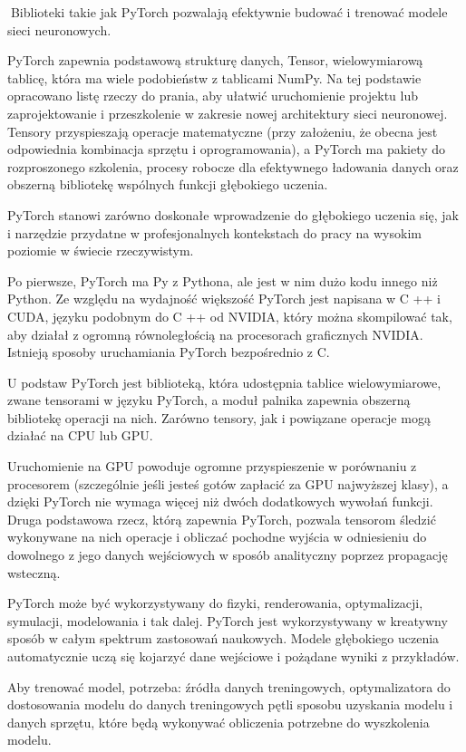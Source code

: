 \documentclass[brudnopis]{xmgr}
\begin{document}
􏰹Biblioteki takie jak PyTorch pozwalają efektywnie budować i trenować modele sieci neuronowych.

PyTorch zapewnia podstawową strukturę danych, Tensor, wielowymiarową tablicę, która ma wiele podobieństw z tablicami NumPy. Na tej podstawie opracowano listę rzeczy do prania, aby ułatwić uruchomienie projektu lub zaprojektowanie i przeszkolenie w zakresie nowej architektury sieci neuronowej. Tensory przyspieszają operacje matematyczne (przy założeniu, że obecna jest odpowiednia kombinacja sprzętu i oprogramowania), a PyTorch ma pakiety do rozproszonego szkolenia, procesy robocze dla efektywnego ładowania danych oraz obszerną bibliotekę wspólnych funkcji głębokiego uczenia.

PyTorch stanowi zarówno doskonałe wprowadzenie do głębokiego uczenia się, jak i narzędzie przydatne w profesjonalnych kontekstach do pracy na wysokim poziomie w świecie rzeczywistym.

Po pierwsze, PyTorch ma Py z Pythona, ale jest w nim dużo kodu innego niż Python. 
Ze względu na wydajność większość PyTorch jest napisana w C ++ i CUDA, języku podobnym do C ++ od NVIDIA, który można skompilować tak, aby działał z ogromną równoległością na procesorach graficznych NVIDIA. Istnieją sposoby uruchamiania PyTorch bezpośrednio z C.

U podstaw PyTorch jest biblioteką, która udostępnia tablice wielowymiarowe, zwane tensorami w języku PyTorch, a moduł palnika zapewnia obszerną bibliotekę operacji na nich. Zarówno tensory, jak i powiązane operacje mogą działać na CPU lub GPU. 

Uruchomienie na GPU powoduje ogromne przyspieszenie w porównaniu z procesorem (szczególnie jeśli jesteś gotów zapłacić za GPU najwyższej klasy), a dzięki PyTorch nie wymaga więcej niż dwóch dodatkowych wywołań funkcji. Druga podstawowa rzecz, którą zapewnia PyTorch, pozwala tensorom śledzić wykonywane na nich operacje i obliczać pochodne wyjścia w odniesieniu do dowolnego z jego danych wejściowych w sposób analityczny poprzez propagację wsteczną. 



PyTorch może być wykorzystywany do fizyki, renderowania, optymalizacji, symulacji, modelowania i tak dalej. PyTorch jest wykorzystywany w kreatywny sposób w całym spektrum zastosowań naukowych. Modele głębokiego uczenia automatycznie uczą się kojarzyć dane wejściowe i pożądane wyniki z przykładów.

Aby trenować model, potrzeba:
źródła danych treningowych, 
optymalizatora do dostosowania modelu do danych treningowych 
pętli  
sposobu uzyskania modelu i danych sprzętu, które będą wykonywać obliczenia potrzebne do wyszkolenia modelu.
\end{document}
